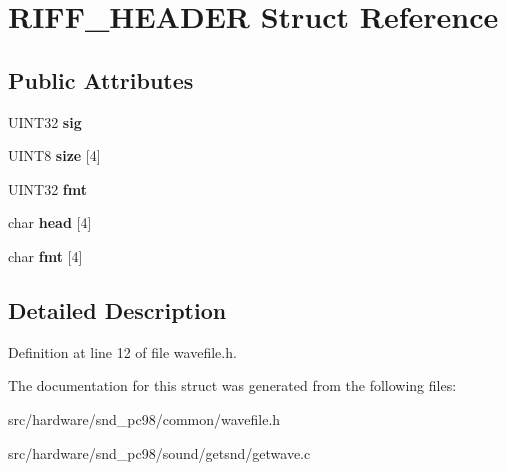 \hypertarget{structRIFF__HEADER}{\section{R\-I\-F\-F\-\_\-\-H\-E\-A\-D\-E\-R Struct Reference}
\label{structRIFF__HEADER}
}
\subsection*{Public Attributes}
\begin{DoxyCompactItemize}
\item 
\hypertarget{structRIFF__HEADER_a5d927bd340f710b97daf71e3b2fef7cf}{U\-I\-N\-T32 {\bfseries sig}}\label{structRIFF__HEADER_a5d927bd340f710b97daf71e3b2fef7cf}

\item 
\hypertarget{structRIFF__HEADER_a1a1874b61c6247042efff14359e9d7f8}{U\-I\-N\-T8 {\bfseries size} \mbox{[}4\mbox{]}}\label{structRIFF__HEADER_a1a1874b61c6247042efff14359e9d7f8}

\item 
\hypertarget{structRIFF__HEADER_a1b84b82216222c4f2a4b746fd8f1208f}{U\-I\-N\-T32 {\bfseries fmt}}\label{structRIFF__HEADER_a1b84b82216222c4f2a4b746fd8f1208f}

\item 
\hypertarget{structRIFF__HEADER_ab0aaf70062ed7e99be1f1bf20963ad21}{char {\bfseries head} \mbox{[}4\mbox{]}}\label{structRIFF__HEADER_ab0aaf70062ed7e99be1f1bf20963ad21}

\item 
\hypertarget{structRIFF__HEADER_a775a147c0419803b2fadf93db9755530}{char {\bfseries fmt} \mbox{[}4\mbox{]}}\label{structRIFF__HEADER_a775a147c0419803b2fadf93db9755530}

\end{DoxyCompactItemize}


\subsection{Detailed Description}


Definition at line 12 of file wavefile.\-h.



The documentation for this struct was generated from the following files\-:\begin{DoxyCompactItemize}
\item 
src/hardware/snd\-\_\-pc98/common/wavefile.\-h\item 
src/hardware/snd\-\_\-pc98/sound/getsnd/getwave.\-c\end{DoxyCompactItemize}
